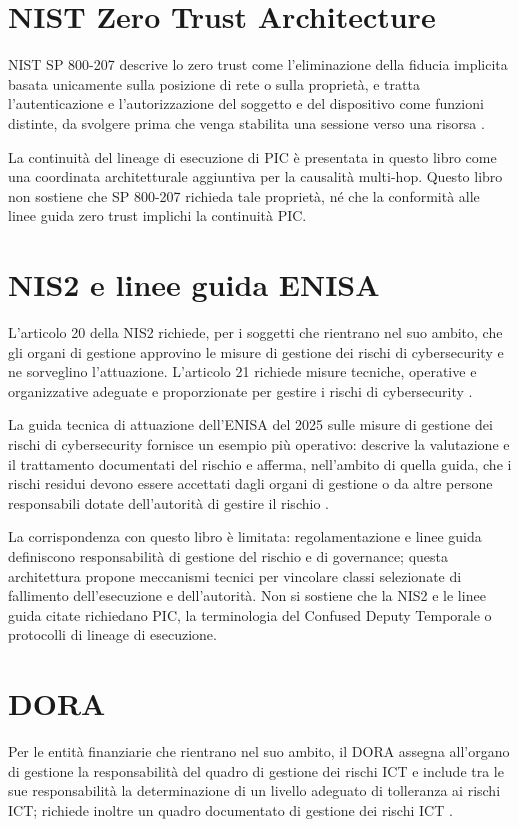 \documentclass[10pt,oneside,openany]{book}
\begin{document}
\section{NIST Zero Trust Architecture}
NIST SP 800-207 descrive lo zero trust come l'eliminazione della fiducia implicita basata unicamente sulla posizione di rete o sulla proprietà, e tratta l'autenticazione e l'autorizzazione del soggetto e del dispositivo come funzioni distinte, da svolgere prima che venga stabilita una sessione verso una risorsa \cite{nistzta2020}.

La continuità del lineage di esecuzione di PIC è presentata in questo libro come una coordinata architetturale aggiuntiva per la causalità multi-hop. Questo libro non sostiene che SP 800-207 richieda tale proprietà, né che la conformità alle linee guida zero trust implichi la continuità PIC.

\section{NIS2 e linee guida ENISA}
L'articolo 20 della NIS2 richiede, per i soggetti che rientrano nel suo ambito, che gli organi di gestione approvino le misure di gestione dei rischi di cybersecurity e ne sorveglino l'attuazione. L'articolo 21 richiede misure tecniche, operative e organizzative adeguate e proporzionate per gestire i rischi di cybersecurity \cite{nis22022}.

La guida tecnica di attuazione dell'ENISA del 2025 sulle misure di gestione dei rischi di cybersecurity fornisce un esempio più operativo: descrive la valutazione e il trattamento documentati del rischio e afferma, nell'ambito di quella guida, che i rischi residui devono essere accettati dagli organi di gestione o da altre persone responsabili dotate dell'autorità di gestire il rischio \cite{enisa2025risk}.

La corrispondenza con questo libro è limitata: regolamentazione e linee guida definiscono responsabilità di gestione del rischio e di governance; questa architettura propone meccanismi tecnici per vincolare classi selezionate di fallimento dell'esecuzione e dell'autorità. Non si sostiene che la NIS2 e le linee guida citate richiedano PIC, la terminologia del Confused Deputy Temporale o protocolli di lineage di esecuzione.

\section{DORA}
Per le entità finanziarie che rientrano nel suo ambito, il DORA assegna all'organo di gestione la responsabilità del quadro di gestione dei rischi ICT e include tra le sue responsabilità la determinazione di un livello adeguato di tolleranza ai rischi ICT; richiede inoltre un quadro documentato di gestione dei rischi ICT \cite{dora2022}.
\end{document}
